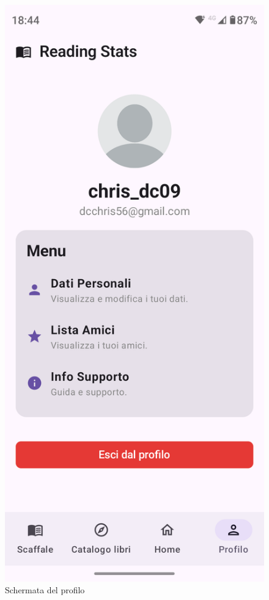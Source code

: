 \documentclass{article}
\begin{document}
\begin{figure}[H]
  \centering
  \includegraphics[width=0.6\linewidth]{profile.png}
  \caption{Schermata del profilo}
  \label{fig:sitemap}
\end{figure}
\end{document}
